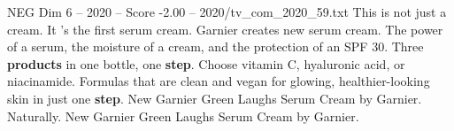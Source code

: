 \begin{textsample}{NEG Dim 6 – 2020 – Score -2.00 – 2020/tv\_com\_2020\_59.txt}  \label{ex:f6_neg_054}
This is not just a cream.
It 's the first serum cream.
Garnier creates new serum cream.
The power of a serum, the moisture of a cream, and the protection of an SPF 30.
Three \textbf{products} in one bottle, one \textbf{step}.
Choose vitamin C, hyaluronic acid, or niacinamide.
Formulas that are clean and vegan for glowing, healthier-looking skin in just one \textbf{step}.
New Garnier Green Laughs Serum Cream by Garnier.
Naturally.
New Garnier Green Laughs Serum Cream by Garnier.

\end{textsample}
